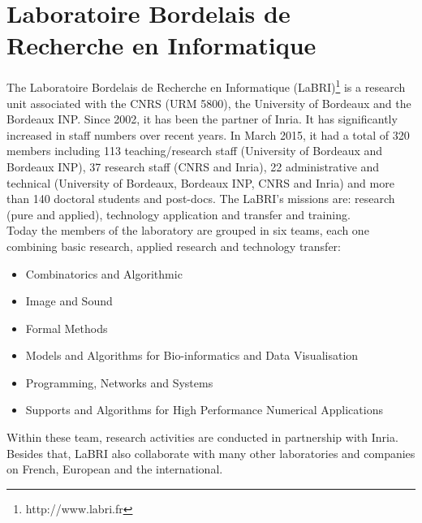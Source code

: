 \section{Laboratoire Bordelais de Recherche en Informatique}
The Laboratoire Bordelais de Recherche en Informatique (LaBRI)\footnote{http://www.labri.fr} is a research unit associated with the CNRS (URM 5800), the University of Bordeaux and the Bordeaux INP. Since 2002, it has been the partner of Inria. It has significantly increased in staff numbers over recent years. In March 2015, it had a total of 320 members including 113 teaching/research staff (University of Bordeaux and Bordeaux INP), 37 research staff (CNRS and Inria), 22 administrative and technical (University of Bordeaux, Bordeaux INP, CNRS and Inria) and more than 140 doctoral students and post-docs. The LaBRI's missions are: research (pure and applied), technology application and transfer and training.\\
Today the members of the laboratory are grouped in six teams, each one combining basic research, applied research and technology transfer:
\begin{itemize}
\item Combinatorics and Algorithmic
\item Image and Sound
\item Formal Methods
\item Models and Algorithms for Bio-informatics and Data Visualisation
\item Programming, Networks and Systems
\item Supports and Algorithms for High Performance Numerical Applications
\end{itemize} 
Within these team, research activities are conducted in partnership with Inria. Besides that, LaBRI also collaborate with many other laboratories and companies on French, European and the international.
